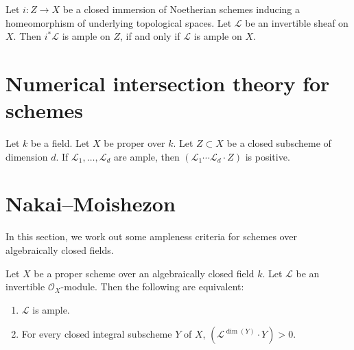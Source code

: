 \begin{lemma}
\label{lemma-ample-on-reduction}
Let $i : Z \to X$ be a closed immersion of Noetherian schemes
inducing a homeomorphism of underlying topological spaces.
Let $\mathcal{L}$ be an invertible sheaf on $X$.
Then $i^*\mathcal{L}$ is ample on $Z$, if and only if
$\mathcal{L}$ is ample on $X$.
\end{lemma}

\section{Numerical intersection theory for schemes}

\begin{lemma}
\label{lemma-ample-positive}
Let $k$ be a field. Let $X$ be proper over $k$. Let $Z \subset X$ be
a closed subscheme of dimension $d$. If $\mathcal{L}_1, \ldots, \mathcal{L}_d$
are ample, then $(\mathcal{L}_1 \cdots \mathcal{L}_d \cdot Z)$ is positive.
\end{lemma}

\section{Nakai--Moishezon}
In this section, we work out some ampleness criteria for schemes over
algebraically closed fields.

\begin{theorem}
\label{theorem-nakai-moishezon}
Let $X$ be a proper scheme over an algebraically closed field $k$.
Let $\mathcal{L}$ be an invertible $\mathcal{O}_X$-module.
Then the following are equivalent:
\begin{enumerate}
  \item $\mathcal{L}$ is ample.
  \item For every closed integral subscheme $Y$ of $X$,
    $(\mathcal{L}^{\dim(Y)} \cdot Y) > 0$.
\end{enumerate}
\end{theorem}

